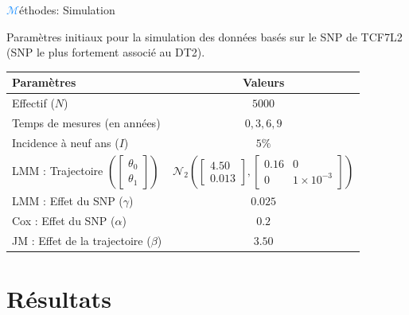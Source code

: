 \begin{frame}{{\huge\textcolor{dodgerblue}{$\mathcal{M}$}}éthodes: Simulation}%
\par{Paramètres initiaux pour la simulation des données basés sur le SNP de \textcolor{springgreen3}{TCF7L2} (SNP le plus fortement associé au \textcolor{springgreen3}{DT2}).}
{\footnotesize \begin{center}
    \begin{tabular}{lc}
        \hline
        Paramètres & Valeurs\\
        \hline
        Effectif ($N$) & $5000$\\
        Temps de mesures (en années) & $0, 3, 6, 9$\\
        Incidence à neuf ans ($I$) & $5\%$\\
        LMM : Trajectoire $\left (\begin{bmatrix}\theta_{0}\\\theta_{1}\end{bmatrix}\right )$ & $\mathcal{N}_2\left (\begin{bmatrix}4.50\\0.013\end{bmatrix} , \begin{bmatrix} 0.16 & 0 \\ 0 & 1\times 10^{-3} \end{bmatrix} \right )$\\
        LMM : Effet du SNP ($\gamma$) & $0.025$\\
        Cox : Effet du SNP ($\alpha$) & $0.2$\\
        JM : Effet de la trajectoire ($\beta$) & $3.50$\\
        \hline
    \end{tabular}
\end{center}}
\end{frame}


\section{Résultats}
